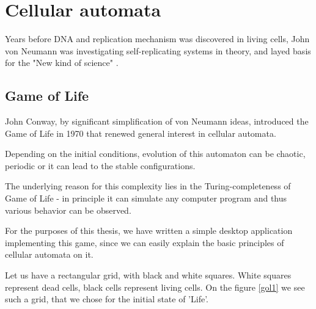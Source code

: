 
\chapter{Cellular automata}


Years before DNA and replication mechanism was discovered in living cells,
John von Neumann was investigating self-replicating systems in theory, 
and layed basis for the "New kind of science" \cite{wolfram}. 



\section{Game of Life}

John Conway, by significant simplification of von Neumann ideas, introduced the Game of Life in 1970 that renewed general interest in cellular automata.

Depending on the initial conditions, evolution of this automaton can be chaotic, periodic or it can lead to the stable configurations.

The underlying reason for this complexity lies in the Turing-completeness of Game of Life - in principle it can simulate any computer program and thus various behavior can be observed.

For the purposes of this thesis, we have written a simple desktop application implementing this game, since we can easily explain the basic principles of cellular automata on it.

Let us have a rectangular grid, with black and white squares. 
White squares represent dead cells, black cells represent living cells.
On the figure \ref{gol1} we see such a grid, that we chose for the initial state of 'Life'.

